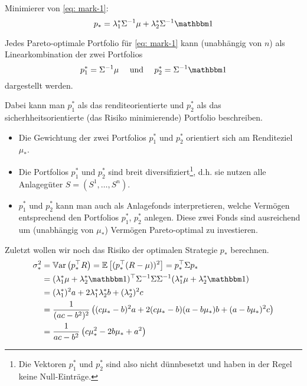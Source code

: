 Minimierer von \eqref{eq: mark-1}:
\begin{equation*}
	p_\ast = \lambda_1^\ast \Sigma^{-1} \mu + \lambda_2^\ast \Sigma^{-1} \one
\end{equation*}

\begin{korollar}
	Jedes Pareto-optimale Portfolio für \eqref{eq: mark-1} kann (unabhängig von $n$) als Linearkombination der zwei Portfolios
	\begin{equation*}
		p_1^\ast = \Sigma^{-1} \mu \quad \und \quad p_2^\ast = \Sigma^{-1} \one
	\end{equation*}
	dargestellt werden.
\end{korollar}
Dabei kann man $p_1^\ast$ als das renditeorientierte und $p_2^\ast$ als das sicherhheitsorientierte (das Risiko minimierende) Portfolio beschreiben.

\begin{*bemerkung}
	\begin{itemize}[nolistsep]
		\item Die Gewichtung der zwei Portfolios $p_1^\ast$ und $p_2^\ast$ orientiert sich am Renditeziel $\mu_\ast$. 
		\item Die Portfolios $p_1^\ast$ und $p_2^\ast$ sind breit diversifiziert\footnote{Die Vektoren $p_1^\ast$ und $p_2^\ast$ sind also nicht dünnbesetzt und haben in der Regel keine Null-Einträge.}, d.h. sie nutzen alle Anlagegüter $S = (S^1, \dots, S^n)$. 
		\item $p_1^\ast$ und $p_2^\ast$ kann man auch als Anlagefonds interpretieren, welche Vermögen entsprechend den Portfolios $p_1^\ast$, $p_2^\ast$ anlegen. Diese zwei Fonds sind ausreichend um (unabhängig von $\mu_\ast$) Vermögen Pareto-optimal zu investieren.
	\end{itemize}
\end{*bemerkung}

Zuletzt wollen wir noch das Risiko der optimalen Strategie $p_\ast$ berechnen.
\begin{equation*}
	\begin{aligned}
		\sigma_\ast^2 &= \Var[\trans{p_\ast} R] = \EW[(\trans{p_\ast} (R - \mu))^2] = \trans{p_\ast} \Sigma p_\ast \\
		&= \trans{(\lambda_1^\ast \mu + \lambda_2^\ast \one)} \Sigma^{-1} \Sigma \Sigma^{-1} (\lambda_1^\ast \mu + \lambda_2^\ast \one) \\
		&= (\lambda_1^\ast)^2 a + 2 \lambda_1^\ast \lambda_2^\ast b + (\lambda_2^\ast)^2 c \\
		&= \frac{1}{(ac - b^2)^2} \brackets{(c\mu_\ast - b)^2 a + 2(c \mu_\ast - b)(a - b \mu_\ast) b + (a- b \mu_\ast)^2 c} \\
		&= \frac{1}{ac - b^2} \brackets{c \mu _\ast^2 - 2b\mu_\ast + a^2}
	\end{aligned}
\end{equation*}

